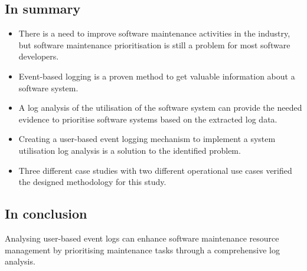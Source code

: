 \subsection{In summary}
\begin{itemize}
	\item There is a need to improve software maintenance activities in the industry, but software maintenance prioritisation is still a problem for most software developers.
	\item Event-based logging is a proven method to get valuable information about a software system.
	\item A log analysis of the utilisation of the software system can provide the needed evidence to prioritise software systems based on the extracted log data.
	\item Creating a user-based event logging mechanism to implement a system utilisation log analysis is a solution to the identified problem.
	\item Three different case studies with two different operational use cases verified the designed methodology for this study.
\end{itemize}

\subsection{In conclusion}
Analysing user-based event logs can enhance software maintenance resource management by prioritising maintenance tasks through a comprehensive log analysis.